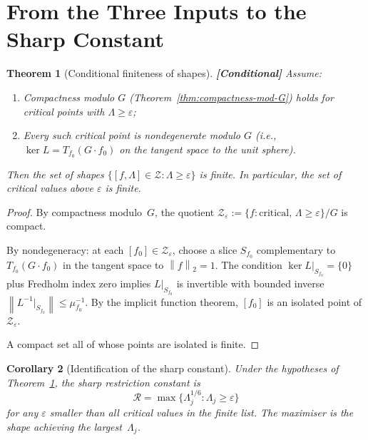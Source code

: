 \documentclass[12pt]{article}
\newtheorem{theorem}{Theorem}[section]
\newtheorem{corollary}[theorem]{Corollary}
\theoremstyle{definition}
\theoremstyle{remark}
\newcommand{\norm}[1]{\left\|#1\right\|}
\newcommand{\conditional}{\textbf{\color{orange}[Conditional]}}
\begin{document}
\section{From the Three Inputs to the Sharp Constant}
\label{sec:finiteness}

\begin{theorem}[Conditional finiteness of shapes]
  \label{thm:finiteness}
  \conditional\quad
  Assume:
  \begin{enumerate}[leftmargin=2em]
    \item Compactness modulo $G$ (Theorem~\ref{thm:compactness-mod-G})
      holds for critical points with $\Lambda\geq\varepsilon$;
    \item Every such critical point is nondegenerate modulo $G$
      (i.e., $\ker L=T_{f_0}(G\cdot f_0)$ on the tangent space to the
      unit sphere).
  \end{enumerate}
  Then the set of shapes $\{[f,\Lambda]\in\mathcal Z:\Lambda\geq\varepsilon\}$
  is finite.  In particular, the set of critical values above $\varepsilon$
  is finite.
\end{theorem}

\begin{proof}
  By compactness modulo~$G$, the quotient
  $\mathcal Z_\varepsilon:=\{f:\text{critical},\,\Lambda\geq\varepsilon\}/G$
  is compact.

  By nondegeneracy: at each $[f_0]\in\mathcal Z_\varepsilon$, choose a slice
  $S_{f_0}$ complementary to $T_{f_0}(G\cdot f_0)$ in the tangent space
  to $\norm{f}_2=1$.  The condition $\ker L|_{S_{f_0}}=\{0\}$ plus
  Fredholm index zero implies $L|_{S_{f_0}}$ is invertible with bounded
  inverse $\norm{L^{-1}|_{S_{f_0}}}\leq\mu_{f_0}^{-1}$.  By the
  implicit function theorem, $[f_0]$ is an isolated point of
  $\mathcal Z_\varepsilon$.

  A compact set all of whose points are isolated is finite.
\end{proof}

\begin{corollary}[Identification of the sharp constant]
  Under the hypotheses of Theorem~\ref{thm:finiteness}, the sharp
  restriction constant is
  \[
    \mathcal R = \max\{\Lambda_j^{1/6}:\Lambda_j\geq\varepsilon\}
  \]
  for any $\varepsilon$ smaller than all critical values in the finite list.
  The maximiser is the shape achieving the largest~$\Lambda_j$.
\end{corollary}
\end{document}

